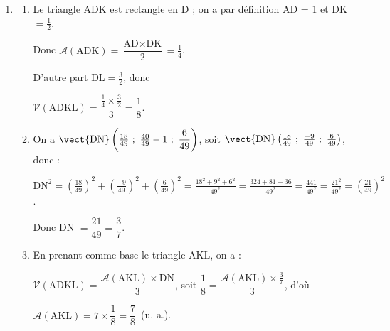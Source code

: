 \begin{enumerate}
\begin{enumerate}
\renewcommand\arraystretch{1.8}
$\left\{\begin{array}{l c r}
x		&=&6\times \dfrac{3}{49}\\
y		&=&1-3\times\dfrac{3}{49}\\
z		&=&2\times \dfrac{3}{49}
\end{array}\right. \iff \left\{\begin{array}{l c r}
x		&=&\dfrac{18}{49}\\
y		&=&\dfrac{40}{49}\\
z		&=&\dfrac{6}{49}
\end{array}\right.$.
\renewcommand\arraystretch{1}
Conclusion : N$\left(\dfrac{18}{49}~;~\dfrac{40}{49}~;~\dfrac{6}{49} \right)$.
	\end{enumerate}







\item 
	\begin{enumerate}
		\item Le triangle ADK est rectangle en D ; on a par définition AD = 1 et DK $=  \frac{1}{2}$.

Donc $\mathcal{A}(\text{ADK}) = \dfrac{\text{AD} \times \text{DK}}{2} = \frac{1}{4}$.

D'autre part $\text{DL} = \frac{3}{2}$, donc 

$\mathcal{V}(\text{ADKL}) = \dfrac{\frac{1}{4} \times \frac{3}{2}}{3} = \dfrac{1}{8}$.
		\item 
On a $\vect{\text{DN}}\left(\frac{18}{49}~;~\frac{40}{49} - 1~;~\dfrac{6}{49} \right)$, soit  $\vect{\text{DN}}\left(\frac{18}{49}~;~\frac{- 9}{49}~;~\frac{6}{49} \right)$, donc :

$\text{DN}^2 = \left(\frac{18}{49}\right)^2 + \left(\frac{-9}{49}\right)^2  + \left(\frac{6}{49}\right)^2 = \frac{18^2 + 9^2 + 6^2}{49^2} = \frac{324 + 81 + 36}{49^2} = \frac{441}{49^2} = \frac{21^2}{49^2} = \left(\frac{21}{49}\right)^2$. 

Donc DN $ = \dfrac{21}{49} = \dfrac{3}{7}$.
		\item 
	En prenant comme base le triangle AKL, on a :
	
$\mathcal{V}(\text{ADKL}) = \dfrac{\mathcal{A}(\text{AKL}) \times \text{DN}}{3}$, soit $\dfrac{1}{8} = \dfrac{\mathcal{A}(\text{AKL}) \times \frac{3}{7}}{3}$, d'où 

$\mathcal{A}(\text{AKL}) = 7 \times \dfrac{1}{8} = \dfrac{7}{8}$~(u. a.).
	\end{enumerate}
\end{enumerate}

\bigskip
